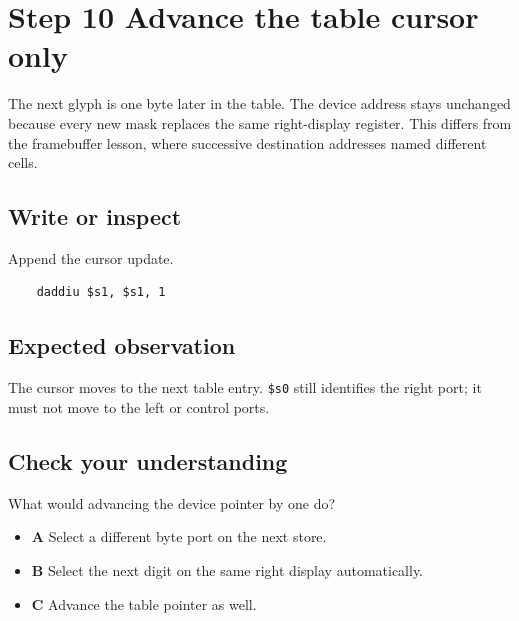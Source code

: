 \section{Step 10 Advance the table cursor
  only}\label{005-seven-segment-counter-s10-step-10-advance-the-table-cursor-only}

The next glyph is one byte later in the table. The device address stays
unchanged because every new mask replaces the same right-display
register. This differs from the framebuffer lesson, where successive
destination addresses named different cells.

\subsection{Write or
  inspect}\label{005-seven-segment-counter-s10-write-or-inspect}

Append the cursor update.

\begin{verbatim}
    daddiu $s1, $s1, 1
\end{verbatim}

\subsection{Expected
  observation}\label{005-seven-segment-counter-s10-expected-observation}

The cursor moves to the next table entry. \texttt{\$s0} still identifies
the right port; it must not move to the left or control ports.

\subsection{Check your
  understanding}\label{005-seven-segment-counter-s10-check-your-understanding}

What would advancing the device pointer by one do?

\begin{itemize}
  \tightlist
  \item
        \textbf{A} Select a different byte port on the next store.
  \item
        \textbf{B} Select the next digit on the same right display
        automatically.
  \item
        \textbf{C} Advance the table pointer as well.
\end{itemize}
